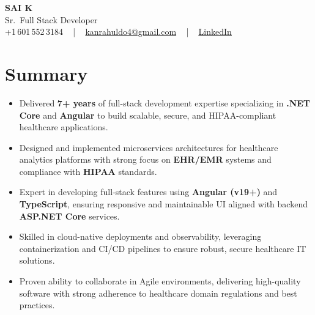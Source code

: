 \documentclass[letterpaper,11pt]{article}
\newcommand{\resumeItem}[1]{
  \item\footnotesize{
    {#1 \vspace{-2pt}}
  }
}
\newcommand{\resumeItemListStart}{\begin{itemize}[leftmargin=*]}
\newcommand{\resumeItemListEnd}{\end{itemize}\vspace{-5pt}}
\begin{document}
\begin{center}
    {\fontsize{14pt}{12pt}\selectfont \textbf{\MakeUppercase{Sai K}}}\\ \vspace{2pt}
    \fontsize{10pt}{12pt}\selectfont Sr.\ Full Stack Developer\\ \vspace{2pt}
    \fontsize{10pt}{12pt}\selectfont +1\,601\,552\,3184 ~ | ~
    \href{mailto:kanrahuldo4@gmail.com}{kanrahuldo4@gmail.com} ~ | ~
    \href{https://www.linkedin.com/in/srrrk/}{\color{blue}\underline{LinkedIn}}
    \vspace{-10pt}
\end{center}

\section{Summary}
\fontsize{9pt}{10pt}\selectfont
\resumeItemListStart
  \resumeItem{Delivered \textbf{7+ years} of full-stack development expertise specializing in \textbf{.NET Core} and \textbf{Angular} to build scalable, secure, and HIPAA-compliant healthcare applications.}
  \resumeItem{Designed and implemented microservices architectures for healthcare analytics platforms with strong focus on \textbf{EHR/EMR} systems and compliance with \textbf{HIPAA} standards.}
  \resumeItem{Expert in developing full-stack features using \textbf{Angular (v19+)} and \textbf{TypeScript}, ensuring responsive and maintainable UI aligned with backend \textbf{ASP.NET Core} services.}
  \resumeItem{Skilled in cloud-native deployments and observability, leveraging containerization and CI/CD pipelines to ensure robust, secure healthcare IT solutions.}
  \resumeItem{Proven ability to collaborate in Agile environments, delivering high-quality software with strong adherence to healthcare domain regulations and best practices.}
\resumeItemListEnd
\vspace{-6pt}

\end{document}
